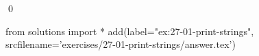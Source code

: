 
\begin{ex}
  \label{ex:27-01-print-strings}
  
  \qed
\end{ex}
\begin{python0}
from solutions import *
add(label="ex:27-01-print-strings",
    srcfilename='exercises/27-01-print-strings/answer.tex')
\end{python0}
